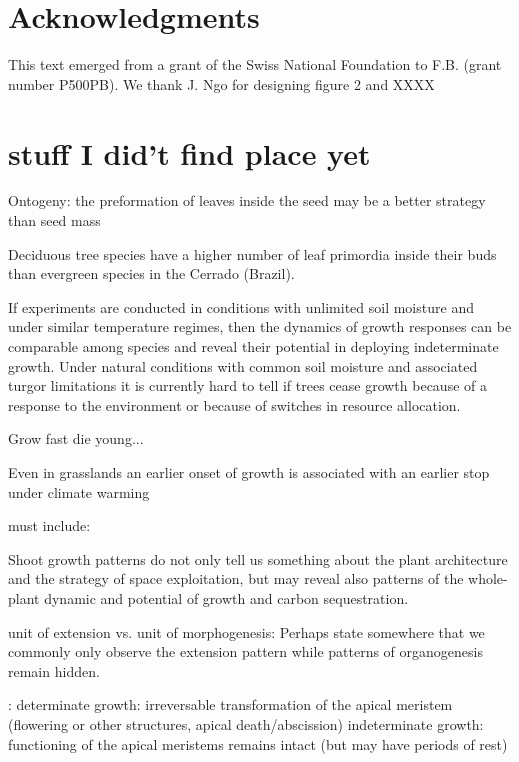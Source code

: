 \documentclass{article}
\begin{document}
	

	
\section*{Acknowledgments}
	This text emerged from a grant of the Swiss National Foundation to F.B. (grant number P500PB). We thank J. Ngo for designing figure 2 and XXXX
	
	

	
	\pagebreak
	

	\newpage
\section*{stuff I did't find place yet}
Ontogeny: 
the preformation of leaves inside the seed may be a better strategy than seed mass \citep{silvaCouldPresencePreformed2023}


Deciduous tree species have a higher number of leaf primordia inside their buds than evergreen species in the Cerrado (Brazil). 
	
If experiments are conducted in conditions with unlimited soil moisture and under similar temperature regimes, then the dynamics of growth responses can be comparable among species and reveal their potential in deploying indeterminate growth. Under natural conditions with common soil moisture and associated turgor limitations it is currently hard to tell if trees cease growth because of a response to the environment or because of switches in resource allocation. 

 Grow fast die young...
 
 Even in grasslands an earlier onset of growth is associated with an earlier stop under climate warming \cite{mohlGrowthAlpineGrassland2022a}
	
	
	must include: 
	
	\cite{iwasaOptimalGrowthSchedule1989}
	
	
	
	Shoot growth patterns do not only tell us something about the plant architecture and the strategy of space exploitation, but may reveal also patterns of the whole-plant dynamic and potential of growth and carbon sequestration.
	
	unit of extension vs. unit of morphogenesis: Perhaps state somewhere that we commonly only observe the extension pattern while patterns of organogenesis remain hidden. 
	
	\cite{barthelemyPlantArchitectureDynamic2007}: determinate growth: irreversable transformation of the apical meristem (flowering or other structures, apical death/abscission)
	indeterminate growth: functioning of the apical meristems remains intact (but may have periods of rest)
	 
	 
	
	\newpage
	
	
	
	
	
	
\end{document}
